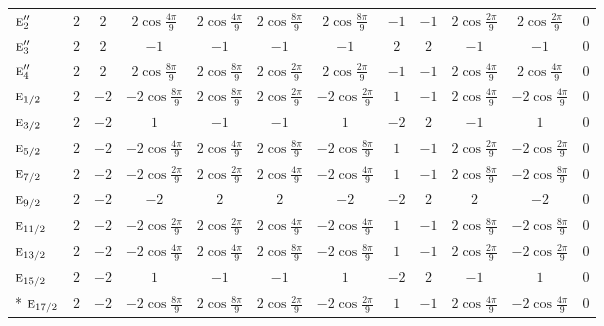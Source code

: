 \documentclass[10pt,a4paper]{article}
\makeatletter
\def\grouprule#1#2{\noalign{\marks\LTgroupmarks{\the\belowrulesep}\nobreak\vskip#1%
  \vskip\aboverulesep}\multispan\LT@cols\unskip{\leaders\hrule\@height#2\hfill\kern\z@}\cr
  \noalign{\penalty\LTrulebreak\vskip\belowrulesep\global\@lastruleclass\z@}}
\numberwithin{equation}{section}
\newcommand{\irr}[1]{\text{\normalfont\scshape #1}}
\makeatother
\begin{document}
{{\begin{longtable}{@{}lccccccccccc@{}}
$\irr{e}_{2}''$ & $2$ & $2$ & $2\cos\tfrac{4\pi}{9}$ & $2\cos\tfrac{4\pi}{9}$ & $2\cos\tfrac{8\pi}{9}$ & $2\cos\tfrac{8\pi}{9}$ & $-1$ & $-1$ & $2\cos\tfrac{2\pi}{9}$ & $2\cos\tfrac{2\pi}{9}$ & $0$\\
$\irr{e}_{3}''$ & $2$ & $2$ & $-1$ & $-1$ & $-1$ & $-1$ & $2$ & $2$ & $-1$ & $-1$ & $0$\\
$\irr{e}_{4}''$ & $2$ & $2$ & $2\cos\tfrac{8\pi}{9}$ & $2\cos\tfrac{8\pi}{9}$ & $2\cos\tfrac{2\pi}{9}$ & $2\cos\tfrac{2\pi}{9}$ & $-1$ & $-1$ & $2\cos\tfrac{4\pi}{9}$ & $2\cos\tfrac{4\pi}{9}$ & $0$\\
\grouprule{0pt}{\lightrulewidth}
$\irr{e}_{1/2}$ & $2$ & $-2$ & $-2\cos\tfrac{8\pi}{9}$ & $2\cos\tfrac{8\pi}{9}$ & $2\cos\tfrac{2\pi}{9}$ & $-2\cos\tfrac{2\pi}{9}$ & $1$ & $-1$ & $2\cos\tfrac{4\pi}{9}$ & $-2\cos\tfrac{4\pi}{9}$ & $0$\\
$\irr{e}_{3/2}$ & $2$ & $-2$ & $1$ & $-1$ & $-1$ & $1$ & $-2$ & $2$ & $-1$ & $1$ & $0$\\
$\irr{e}_{5/2}$ & $2$ & $-2$ & $-2\cos\tfrac{4\pi}{9}$ & $2\cos\tfrac{4\pi}{9}$ & $2\cos\tfrac{8\pi}{9}$ & $-2\cos\tfrac{8\pi}{9}$ & $1$ & $-1$ & $2\cos\tfrac{2\pi}{9}$ & $-2\cos\tfrac{2\pi}{9}$ & $0$\\
$\irr{e}_{7/2}$ & $2$ & $-2$ & $-2\cos\tfrac{2\pi}{9}$ & $2\cos\tfrac{2\pi}{9}$ & $2\cos\tfrac{4\pi}{9}$ & $-2\cos\tfrac{4\pi}{9}$ & $1$ & $-1$ & $2\cos\tfrac{8\pi}{9}$ & $-2\cos\tfrac{8\pi}{9}$ & $0$\\
$\irr{e}_{9/2}$ & $2$ & $-2$ & $-2$ & $2$ & $2$ & $-2$ & $-2$ & $2$ & $2$ & $-2$ & $0$\\
$\irr{e}_{11/2}$ & $2$ & $-2$ & $-2\cos\tfrac{2\pi}{9}$ & $2\cos\tfrac{2\pi}{9}$ & $2\cos\tfrac{4\pi}{9}$ & $-2\cos\tfrac{4\pi}{9}$ & $1$ & $-1$ & $2\cos\tfrac{8\pi}{9}$ & $-2\cos\tfrac{8\pi}{9}$ & $0$\\
$\irr{e}_{13/2}$ & $2$ & $-2$ & $-2\cos\tfrac{4\pi}{9}$ & $2\cos\tfrac{4\pi}{9}$ & $2\cos\tfrac{8\pi}{9}$ & $-2\cos\tfrac{8\pi}{9}$ & $1$ & $-1$ & $2\cos\tfrac{2\pi}{9}$ & $-2\cos\tfrac{2\pi}{9}$ & $0$\\
$\irr{e}_{15/2}$ & $2$ & $-2$ & $1$ & $-1$ & $-1$ & $1$ & $-2$ & $2$ & $-1$ & $1$ & $0$\\*
$\irr{e}_{17/2}$ & $2$ & $-2$ & $-2\cos\tfrac{8\pi}{9}$ & $2\cos\tfrac{8\pi}{9}$ & $2\cos\tfrac{2\pi}{9}$ & $-2\cos\tfrac{2\pi}{9}$ & $1$ & $-1$ & $2\cos\tfrac{4\pi}{9}$ & $-2\cos\tfrac{4\pi}{9}$ & $0$\\
\bottomrule\end{longtable}}}
\end{document}
